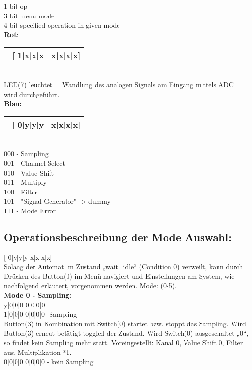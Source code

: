 {\color{red} 1 bit op}\\
{\color{blue}3 bit menu mode}\\
{\color{orange}4 bit specified operation in given mode}\\
\textbf{Rot}:	
\begin{table}[H]
	\centering
	\begin{tabular}{|l|r|}
		\hline
		\ [{\color{red} 1}{\color{blue}|x|x|x} &{\color{orange} x|x|x|x}]	\\
		\hline
	\end{tabular}
\end{table}
\\
\noindent LED(7) leuchtet = Wandlung des analogen Signals am Eingang mittels ADC wird durchgeführt.\\
\textbf{Blau:}
\begin{table}[H]
	\centering
	\begin{tabular}{|l|r|}
		\hline
		\ [{\color{red} 0}{\color{blue}|y|y|y} &{\color{orange} x|x|x|x}]	\\
		\hline
	\end{tabular}
\end{table}
\\
000 - Sampling\\
001 - Channel Select\\
010 - Value Shift\\
011 - Multiply\\
100 - Filter\\
101 - "Signal Generator" -> dummy\\
111 - Mode Error\\
\newpage
\subsection{Operationsbeschreibung der Mode Auswahl:}

[{\color{red} 0}{\color{blue}|y|y|y} {\color{orange} x|x|x|x}]	\\
Solang der Automat im Zustand „wait\_idle“ (Condition 0) verweilt, kann durch Drücken des Button(0) im Menü navigiert und Einstellungen am System, wie nachfolgend erläutert, vorgenommen werden. Mode: (0-5).\\

\noindent \textbf{Mode 0 - Sampling:}\\
{\color{red} y}{\color{blue}|0|0|0} {\color{orange} 0|0|0|0} \\
{\color{red} 1}{\color{blue}|0|0|0} {\color{orange} 0|0|0|0}- Sampling \\
Button(3) in Kombination mit Switch(0) startet bzw. stoppt das Sampling. Wird Button(3) erneut betätigt toggled der Zustand. Wird Switch(0) ausgeschaltet „0“, so findet kein Sampling mehr statt.
Voreingestellt: Kanal 0, Value Shift 0, Filter aus, Multiplikation *1.\\
{\color{red} 0}{\color{blue}|0|0|0} {\color{orange} 0|0|0|0} - kein Sampling\\

